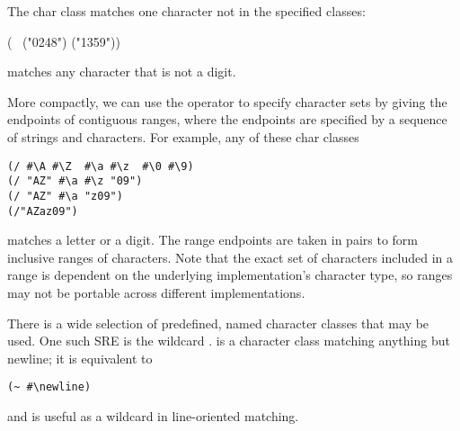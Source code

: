The  char class matches one character 
not in the specified classes:
\begin{code}
(~ ("0248") ("1359"))\end{code}
%
matches any character that is not a digit. 

More compactly, we can use the \ex{/} operator to specify character sets by 
giving the endpoints of contiguous ranges, where the endpoints are specified 
by a sequence of strings and characters.  
For example, any of these char classes
\begin{inset}
\begin{verbatim}
(/ #\A #\Z  #\a #\z  #\0 #\9)
(/ "AZ" #\a #\z "09")
(/ "AZ" #\a "z09")
(/"AZaz09")
\end{verbatim}\end{inset}%
%
matches a letter or a digit. The range endpoints are taken in pairs to
form inclusive ranges of characters. Note that the exact set of characters
included in a range is dependent on the underlying implementation's 
character type, so ranges may not be portable across different implementations.

There is a wide selection of predefined, named character classes that may be
used. One such SRE is the wildcard . 
 is a character class matching anything but newline; 
it is equivalent to
\begin{inset}
\begin{verbatim}
(~ #\newline)
\end{verbatim}\end{inset}%
%
and is useful as a wildcard in line-oriented matching.

